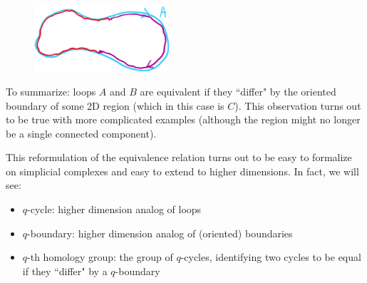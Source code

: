\begin{figure}[H]
    \includegraphics[width=5cm]{figures/intuition-4}
    \centering
\end{figure}
To summarize: loops $A$ and $B$ are equivalent if they ``differ" by the oriented boundary of some 2D region (which in this case is $C$). This observation turns out to be true with more complicated examples (although the region might no longer be a single connected component).

This reformulation of the equivalence relation turns out to be easy to formalize on simplicial complexes and easy to extend to higher dimensions. In fact, we will see:
\begin{itemize}
    \item $q$-cycle: higher dimension analog of loops
    \item $q$-boundary: higher dimension analog of (oriented) boundaries
    \item $q$-th homology group: the group of $q$-cycles, identifying two cycles to be equal if they ``differ" by a $q$-boundary
\end{itemize}
